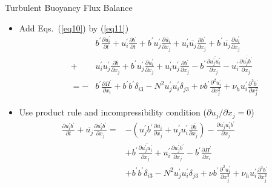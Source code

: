 \begin{frame}{Turbulent Buoyancy Flux Balance}
\begin{itemize}
  	\item Add Eqs.~(\ref{eq10}) by (\ref{eq11})
  	\small
  	\begin{align*}
  	& b^\prime\frac{\partial u_i^\prime}{\partial t} + u_i^\prime\frac{\partial b^\prime}{\partial t} + b^\prime u_j^\prime \frac{\partial \overline{u_i}}{\partial x_j} + u_i^\prime \overline{u_j}\frac{\partial b^\prime}{\partial x_j} + b^\prime \overline{u_j}\frac{\partial u_i^\prime}{\partial x_j} \\+ &u_i^\prime u_j^\prime \frac{\partial \overline{b}}{\partial x_j} + b^\prime u_j^\prime \frac{\partial u_i^\prime}{\partial x_j} + u_i^\prime u_j^\prime \frac{\partial b^\prime}{\partial x_j} - b^\prime \frac{\partial \overline{u_j^\prime u_i^\prime}}{\partial x_j} - u_i^\prime \frac{\partial \overline{u_j^\prime b^\prime}}{\partial x_j}\\
  	=-&b^\prime\frac{\partial \Pi^\prime}{\partial x_i} +b^\prime b^\prime\delta_{i3} -N^2 u_j^\prime u_i^\prime \delta_{j3} + \nu b^\prime \frac{\partial^2 u_i^\prime}{\partial x_j^2} + \nu_h u_i^\prime \frac{\partial^2 b^\prime}{\partial x_j^2} 
  	\end{align*}
  	\item Use product rule and incompressibility condition ($\partial u_j/\partial x_j = 0$)
  	\begin{align*}
  		\frac{\partial u_i^\prime b^\prime}{\partial t} + \overline{u_j}\frac{\partial u_i^\prime b^\prime}{\partial x_j} = &-\left(u_j^\prime b^\prime \frac{\partial \overline{u_i}}{\partial x_j} +  u_j^\prime u_i^\prime \frac{\partial \overline{b}}{\partial x_j}\right) - \frac{\partial u_j^\prime u_i^\prime b^\prime}{\partial x_j} \\ &+b^\prime \frac{\partial \overline{u_j^\prime u_i^\prime}}{\partial x_j} + u_i^\prime \frac{\partial \overline{u_j^\prime b^\prime}}{\partial x_j} - b^\prime\frac{\partial \Pi^\prime}{\partial x_i}\\ &+ b^\prime b^\prime \delta_{i3} -N^2 u_j^\prime u_i^\prime \delta_{j3} + \nu b^\prime \frac{\partial^2 u_i^\prime}{\partial x_j^2} + \nu_h u_i^\prime \frac{\partial^2 b^\prime}{\partial x_j^2}
  	\end{align*}

  \end{itemize}
\end{frame}
